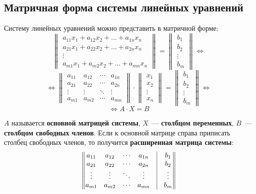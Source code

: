 \subsection{Матричная форма системы линейных уравнений}
Систему линейных уравнений можно представить в матричной форме:
\begin{equation*}
\begin{Vmatrix}
a_{11}x_1 + a_{12}x_2 + \dots + a_{1n}x_n \\
a_{21}x_1 + a_{22}x_2 + \dots + a_{2n}x_n \\
\vdots \\
a_{m1}x_1 + a_{m2}x_2 + \dots + a_{mn}x_n
\end{Vmatrix} =
\begin{Vmatrix}
b_1 \\
b_2 \\
\vdots \\
b_m
\end{Vmatrix}
\Leftrightarrow
\end{equation*}
\begin{equation*}
\Leftrightarrow
\begin{Vmatrix}
a_{11} & a_{12} & \cdots & a_{1n} \\
a_{21} & a_{22} & \cdots & a_{2n} \\
\vdots & \vdots & \ddots & \vdots \\
a_{m1} & a_{m2} & \cdots & a_{mn}
\end{Vmatrix} \cdot
\begin{Vmatrix}
x_1 \\
x_2 \\
\vdots \\
x_n
\end{Vmatrix} =
\begin{Vmatrix}
b_1 \\
b_2 \\
\vdots \\
b_m
\end{Vmatrix}
\Leftrightarrow
\end{equation*}
\begin{equation*}
\Leftrightarrow
A \cdot X = B
\end{equation*}

$A$ называется \textbf{основной матрицей системы}, $X$~--- \textbf{столбцом переменных}, $B$~--- \textbf{столбцом свободных членов}.
Если к основной матрице справа приписать столбец свободных членов, то получится \textbf{расширенная матрица системы}:
\begin{equation*}
\begin{Vmatrix}
a_{11} & a_{12} & \cdots & a_{1n} & \vline & b_1 \\
a_{21} & a_{22} & \cdots & a_{2n} & \vline & b_2 \\
\vdots & \vdots & \ddots & \vdots & \vline & \vdots \\
a_{m1} & a_{m2} & \cdots & a_{mn} & \vline & b_m
\end{Vmatrix}
\end{equation*}

